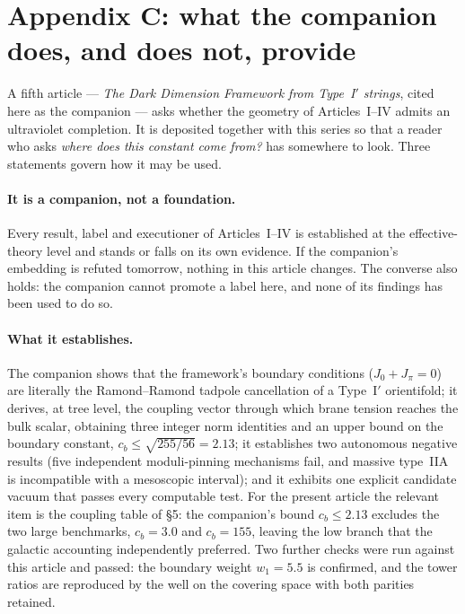\section*{Appendix C: what the companion does, and does not, provide}
\label{app:companion}

A fifth article --- \emph{The Dark Dimension Framework from Type~I$'$ strings}, cited here as the companion --- asks whether the geometry of Articles~I--IV admits an ultraviolet completion. It is deposited together with this series so that a reader who asks \emph{where does this constant come from?} has somewhere to look. Three statements govern how it may be used.

\paragraph{It is a companion, not a foundation.} Every result, label and executioner of Articles~I--IV is established at the effective-theory level and stands or falls on its own evidence. If the companion's embedding is refuted tomorrow, nothing in this article changes. The converse also holds: the companion cannot promote a label here, and none of its findings has been used to do so.

\paragraph{What it establishes.} The companion shows that the framework's boundary conditions ($J_{0}+J_{\pi}=0$) are literally the Ramond--Ramond tadpole cancellation of a Type~I$'$ orientifold; it derives, at tree level, the coupling vector through which brane tension reaches the bulk scalar, obtaining three integer norm identities and an upper bound on the boundary constant, $c_{b}\leq\sqrt{255/56}=2.13$; it establishes two autonomous negative results (five independent moduli-pinning mechanisms fail, and massive type~IIA is incompatible with a mesoscopic interval); and it exhibits one explicit candidate vacuum that passes every computable test. For the present article the relevant item is the coupling table of \S5: the companion's bound $c_{b}\leq2.13$ excludes the two large benchmarks, $c_{b}=3.0$ and $c_{b}=155$, leaving the low branch that the galactic accounting independently preferred. Two further checks were run against this article and passed: the boundary weight $w_{1}=5.5$ is confirmed, and the tower ratios are reproduced by the well on the covering space with both parities retained.


